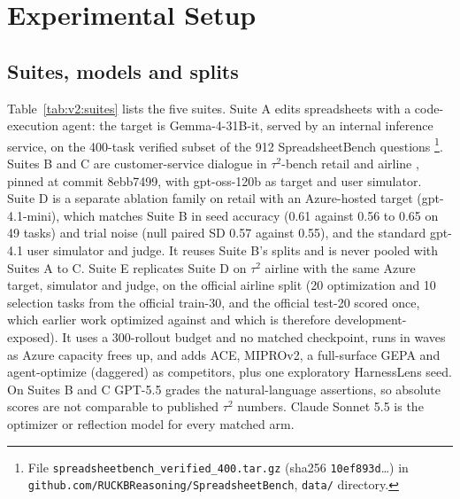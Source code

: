 \section{Experimental Setup}
\label{sec:v2:setup}

\subsection{Suites, models and splits}

Table~\ref{tab:v2:suites} lists the five suites. Suite A edits spreadsheets with a code-execution agent: the target is Gemma-4-31B-it, served by an internal inference service, on the 400-task verified subset of the 912 SpreadsheetBench questions \citep{spreadsheetbench}\footnote{File \texttt{spreadsheetbench\_verified\_400.tar.gz} (sha256 \texttt{10ef893d}\ldots) in \texttt{github.com/RUCKBReasoning/SpreadsheetBench}, \texttt{data/} directory.}. Suites B and C are customer-service dialogue in $\tau^2$-bench retail and airline \citep{tau2-bench,tau_bench}, pinned at commit 8ebb7499, with gpt-oss-120b as target and user simulator. Suite D is a separate ablation family on retail with an Azure-hosted target (gpt-4.1-mini), which matches Suite B in seed accuracy (0.61 against 0.56 to 0.65 on 49 tasks) and trial noise (null paired SD 0.57 against 0.55), and the standard gpt-4.1 user simulator and judge. It reuses Suite B's splits and is never pooled with Suites A to C. Suite E replicates Suite D on $\tau^2$ airline with the same Azure target, simulator and judge, on the official airline split (20 optimization and 10 selection tasks from the official train-30, and the official test-20 scored once, which earlier work optimized against and which is therefore development-exposed). It uses a 300-rollout budget and no matched checkpoint, runs in waves as Azure capacity frees up, and adds ACE, MIPROv2, a full-surface GEPA and agent-optimize (daggered) as competitors, plus one exploratory HarnessLens seed. On Suites B and C GPT-5.5 grades the natural-language assertions, so absolute scores are not comparable to published $\tau^2$ numbers. Claude Sonnet 5.5 is the optimizer or reflection model for every matched arm.

